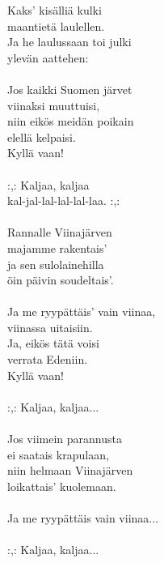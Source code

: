 
            Kaks’ kisälliä kulki \\
            maantietä laulellen. \\
            Ja he laulussaan toi julki \\
            ylevän aattehen: \\
\hspace{10mm} \\
            Jos kaikki Suomen järvet \\
            viinaksi muuttuisi, \\
            niin eikös meidän poikain \\
            elellä kelpaisi. \\
            Kyllä vaan! \\
\hspace{10mm} \\
            :,: Kaljaa, kaljaa \\
            kal-jal-lal-lal-lal-laa. :,: \\
\hspace{10mm} \\
            Rannalle Viinajärven \\
            majamme rakentais’ \\
            ja sen sulolainehilla \\
            öin päivin soudeltais’. \\
\hspace{10mm} \\
            Ja me ryypättäis’ vain viinaa, \\
            viinassa uitaisiin. \\
            Ja, eikös tätä voisi \\
            verrata Edeniin. \\
            Kyllä vaan! \\
\hspace{10mm} \\
            :,: Kaljaa, kaljaa... \\
\hspace{10mm} \\
            Jos viimein parannusta \\
            ei saatais krapulaan, \\
            niin helmaan Viinajärven \\
            loikattais’ kuolemaan. \\
\hspace{10mm} \\
            Ja me ryypättäis vain viinaa... \\
\hspace{10mm} \\
            :,: Kaljaa, kaljaa... \\
